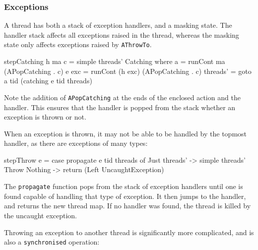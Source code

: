 \subsubsection{Exceptions}
\label{sec:execution-stepwise-exception}

A thread has both a stack of exception handlers, and a masking
state. The handler stack affects all exceptions raised in the thread,
whereas the masking state only affects exceptions raised by
\verb|AThrowTo|.

\begin{haskellcode}
stepCatching h ma c = simple threads' Catching where
  a     = runCont ma      (APopCatching . c)
  e exc = runCont (h exc) (APopCatching . c)
  threads' = goto a tid (catching e tid threads)
\end{haskellcode}

Note the addition of \verb|APopCatching| at the ends of the enclosed
action and the handler. This ensures that the handler is popped from
the stack whether an exception is thrown or not.

When an exception is thrown, it may not be able to be handled by the
topmost handler, as there are exceptions of many types:

\begin{haskellcode}
stepThrow e = case propagate e tid threads of
    Just threads' -> simple threads' Throw
    Nothing -> return (Left UncaughtException)
\end{haskellcode}

The \verb|propagate| function pops from the stack of exception
handlers until one is found capable of handling that type of
exception. It then jumps to the handler, and returns the new thread
map. If no handler was found, the thread is killed by the uncaught
exception.

Throwing an exception to another thread is significantly more
complicated, and is also a \verb|synchronised| operation:



